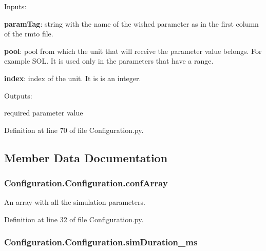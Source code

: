 \begin{DoxyItemize}
\item Inputs\-:
\begin{DoxyItemize}
\item {\bfseries param\-Tag}\-: string with the name of the wished parameter as in the first column of the rmto file.
\item {\bfseries pool}\-: pool from which the unit that will receive the parameter value belongs. For example S\-O\-L. It is used only in the parameters that have a range.
\item {\bfseries index}\-: index of the unit. It is is an integer.
\end{DoxyItemize}
\item Outputs\-:
\begin{DoxyItemize}
\item required parameter value 
\end{DoxyItemize}
\end{DoxyItemize}

Definition at line 70 of file Configuration.\-py.



\subsection{Member Data Documentation}
\hypertarget{class_configuration_1_1_configuration_a2b8c2d210ef82ba5088de3c8c9a8725d}{
\subsubsection[{conf\-Array}]{\setlength{\rightskip}{0pt plus 5cm}Configuration.\-Configuration.\-conf\-Array}}\label{class_configuration_1_1_configuration_a2b8c2d210ef82ba5088de3c8c9a8725d}


An array with all the simulation parameters. 



Definition at line 32 of file Configuration.\-py.

\hypertarget{class_configuration_1_1_configuration_aea238884fe3daa1287aa069f35d4ad3e}{
\subsubsection[{sim\-Duration\-\_\-ms}]{\setlength{\rightskip}{0pt plus 5cm}Configuration.\-Configuration.\-sim\-Duration\-\_\-ms}}\label{class_configuration_1_1_configuration_aea238884fe3daa1287aa069f35d4ad3e}


